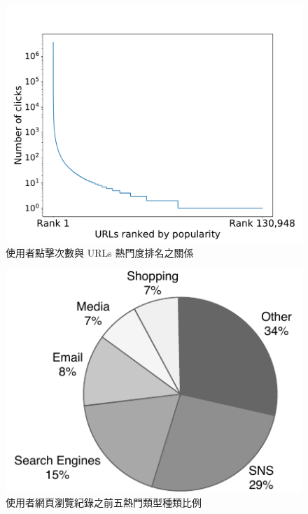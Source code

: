 \begin{figure}[h]
    \graphicspath{{fig/}}
    \begin{center}
    \includegraphics[scale=0.35]{fig/Proportion_of_url-eps-converted-to.pdf}
    \caption{使用者點擊次數與 URLs 熱門度排名之關係}
    \label{fig:url_popul}
    \end{center}
\end{figure}

\begin{figure}[h]
    \graphicspath{{fig/}}
    \begin{center}
    \includegraphics[scale=0.8]{fig/cate_pie.pdf}
    \caption{使用者網頁瀏覽紀錄之前五熱門類型種類比例}
    \label{fig:cate_pie}
    \end{center}
\end{figure}

